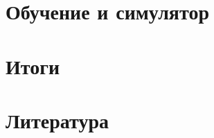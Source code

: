 \documentclass[10pt]{beamer}
\begin{document}
\section{Обучение и симулятор}



\section{Итоги}


\section{Литература}



\end{document}
